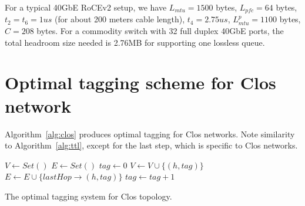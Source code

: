 \begin{appendices}
For a typical 40GbE RoCEv2 setup, we have $L_{mtu}=1500$ bytes, $L_{pfc}=64$
bytes, $t_2=t_6=1us$ (for about 200 meters cable length), $t_4=2.75us$,
$L^{p}_{mtu}=1100$ bytes, $C=208$ bytes.  For a commodity switch with 32
full duplex 40GbE ports, the total headroom size needed is 2.76MB for
supporting one lossless queue.  

\section{Optimal tagging scheme for Clos network}
\label{sec:clos_optimal}

Algorithm~\ref{alg:clos} produces optimal tagging for Clos networks. Note
similarity to Algorithm~\ref{alg:ttl}, except for the last step, which is
specific to Clos networks.

\begin{algorithm}
	\small
	$V \gets Set()$\;
	$E \gets Set()$\; 
	 {
		$tag \gets 0$\;
		 {
			$V \gets V \cup \{(h, tag)\}$\;
			$E \gets E \cup \{lastHop\rightarrow(h, tag)\}$\;
			 {
				$tag \gets tag+1$\;
			}
		}
	}
	\;
    \caption{The optimal tagging system for Clos topology.}
	\label{alg:clos}
\end{algorithm}
\end{appendices}
